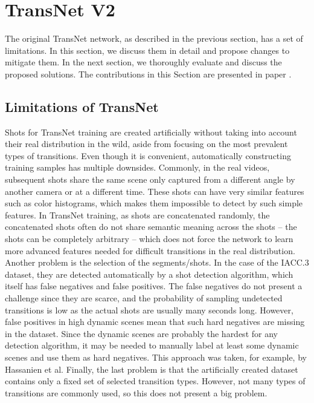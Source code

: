 \section{TransNet V2}\label{sec:transnetv2}

The original TransNet network, as described in the previous section, has a set of limitations. In this section, we discuss them in detail and propose changes to mitigate them. In the next section, we thoroughly evaluate and discuss the proposed solutions. The contributions in this Section are presented in paper \cite{soucek2020transnetv2}.

\subsection{Limitations of TransNet}\label{sec:limitsoftransnet}
Shots for TransNet training are created artificially without taking into account their real distribution in the wild, aside from focusing on the most prevalent types of transitions. Even though it is convenient, automatically constructing training samples has multiple downsides. Commonly, in the real videos, subsequent shots share the same scene only captured from a different angle by another camera or at a different time. These shots can have very similar features such as color histograms, which makes them impossible to detect by such simple features. In TransNet training, as shots are concatenated randomly, the concatenated shots often do not share semantic meaning across the shots -- the shots can be completely arbitrary -- which does not force the network to learn more advanced features needed for difficult transitions in the real distribution. Another problem is the selection of the segments/shots. In the case of the IACC.3 dataset, they are detected automatically by a shot detection algorithm, which itself has false negatives and false positives. The false negatives do not present a challenge since they are scarce, and the probability of sampling undetected transitions is low as the actual shots are usually many seconds long. However, false positives in high dynamic scenes mean that such hard negatives are missing in the dataset. Since the dynamic scenes are probably the hardest for any detection algorithm, it may be needed to manually label at least some dynamic scenes and use them as hard negatives. This approach was taken, for example, by Hassanien et al. Finally, the last problem is that the artificially created dataset contains only a fixed set of selected transition types. However, not many types of transitions are commonly used, so this does not present a big problem.


